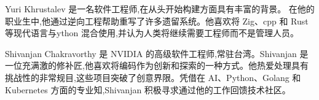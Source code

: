 ﻿Yuri Khrustalev 是一名软件工程师,在从头开始构建方面具有丰富的背景。 在他的职业生中,他通过逆向工程帮助重写了许多遗留系统。他喜欢将 Zig、cpp 和 Rust 等现代语言与ython 混合使用,并认为人类将继续需要工程师而不是管理人员。

Shivanjan Chakravorthy 是 NVIDIA 的高级软件工程师,常驻台湾。Shivanjan 是一位充满激的修补匠,他喜欢将编码作为创新和探索的一种方式。他热爱处理具有挑战性的非常规目,这些项目突破了创意界限。凭借在 AI、Python、Golang 和 Kubernetes 方面的专业知,Shivanjan 积极寻求通过他的工作回馈技术社区。